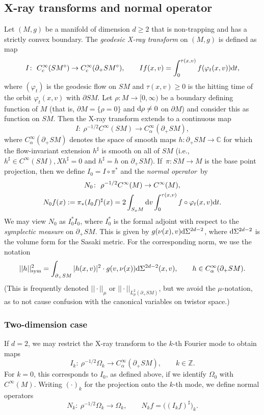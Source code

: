 \documentclass[10pt,a4paper]{amsart}
\numberwithin{equation}{section}
\theoremstyle{definition}
\newcommand{\Z}{\mathbb{Z}} %
\newcommand{\C}{\mathbb{C}} %
\newcommand{\1}{{\bf 1}}
\begin{document}
\subsection{X-ray transforms and normal operator}\label{s_geoxray} Let $(M,g)$ be a manifold of dimension $d\ge 2$ that is non-trapping
and has a strictly convex boundary.
The
 {\it geodesic X-ray transform} on $(M,g)$ is defined as map
\[
	I\colon\ C_c^\infty(SM^\circ)\rightarrow C^\infty_c(\partial_+SM^\circ),\qquad If(x,v)=\int_0^{\tau(x,v)} f(\varphi_t(x,v)) {\rm d}t,
\]
where $(\varphi_t)$ is the geodesic flow on $SM$ and $\tau(x,v)\ge 0$ is the hitting time of the orbit $\varphi_t(x,v)$ with $\partial SM$. Let $\rho\colon M\to [0,\infty)$ be a boundary defining function of $M$ (that is, $\partial M= \{\rho=0\}$ and ${\rm d}\rho \neq 0$ on $\partial M$) and consider this as function on $SM$. Then the X-ray transform extends to a continuous map
\begin{equation}\label{def_xray}
	I\colon\ \rho^{-1/2}C^\infty(SM)\rightarrow C_\alpha^\infty(\partial_+SM),
\end{equation}
where $C_\alpha^\infty(\partial_+SM)$ denotes the space of smooth maps $h\colon \partial_+SM\rightarrow \C$ for which the flow-invariant extension $h^\sharp$ is smooth on all of $SM$ (i.e., $h^\sharp \in C^\infty(SM), Xh^\sharp =0$ and $h^\sharp = h$ on $\partial_+SM$). If~${\pi\colon SM\rightarrow M}$ is the base point projection, then we define $I_0=I\circ \pi^*$ and the {\it normal operator}~by
\begin{gather*}
	N_0\colon \ \rho^{-1/2}C^\infty(M)\rightarrow C^\infty(M),\\
 N_0 f(x):= \pi_*(I_0 f)^\sharp(x) = 2\int_{S_x M} {\rm d}v \int_0^{\tau(x,v)} f\circ \varphi_t(x,v) {\rm d}t.
\end{gather*}
We may view $N_0$ as $I_0^* I_0$, where $I_0^*$ is the formal adjoint with respect to the {\it symplectic measure} on $\partial_+SM$. This is given by $g(\nu(x),v) {\rm d}\Sigma^{2d-2}$, where ${\rm d} \Sigma^{2d-2}$ is the volume form for the {Sasaki metric}. For the corresponding norm, we use the notation
\[
|| h ||_{\mathrm{sym}}^2 = \int_{\partial_+SM} |h(x,v)|^2\cdot g(v,\nu(x)) {\rm d}\Sigma^{2d-2}(x,v),\qquad h\in C_\alpha^\infty(\partial_+SM).
\]
(This is frequently denoted $||\cdot||_\mu$ or $||\cdot||_{L^2_\mu(\partial_+SM)}$, but we avoid the $\mu$-notation, as to not cause confusion with the canonical variables on twistor space.)


\subsubsection{Two-dimension case}
If $d=2$, we may restrict the X-ray transform to the $k$-th Fourier mode to obtain maps
\[
I_k\colon\ \rho^{-1/2} \Omega_k\rightarrow C_\alpha^\infty(\partial_+SM),\qquad k\in \Z.
\]
For $k=0$, this corresponds to $I_0$, as defined above, if we identify $\Omega_0$ with $C^\infty(M)$. Writing $(\cdot)_k$ for the projection onto the $k$-th mode, we define normal operators
\[
	N_k\colon\ \rho^{-1/2}\Omega_k\rightarrow \Omega_k,\qquad N_k f = \bigl((I_k f)^\sharp\bigr)_k.
\]
\end{document}

